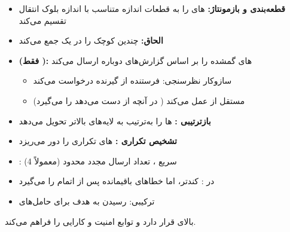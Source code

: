 
\begin{itemize}
\tightlist
\item
  \textbf{قطعه‌بندی و بازمونتاژ:} های  را به قطعات اندازه  متناسب با اندازه بلوک انتقال تقسیم می‌کند
\item
  \textbf{الحاق:} چندین  کوچک را در یک  جمع می‌کند
\item
  \textbf{ (فقط ):} های  گمشده را بر اساس گزارش‌های  دوباره ارسال می‌کند

  \begin{itemize}
  \tightlist
  \item
    سازوکار نظرسنجی: فرستنده  از گیرنده  درخواست می‌کند
  \item
    مستقل از  عمل می‌کند ( در  آنچه  از دست می‌دهد را می‌گیرد)
  \end{itemize}
\item
  \textbf{بازترتیبی :} ها را به‌ترتیب به لایه‌های بالاتر تحویل می‌دهد
\item
  \textbf{تشخیص تکراری :} های تکراری را دور می‌ریزد
\end{itemize}


\begin{itemize}
\tightlist
\item
  : سریع ، تعداد ارسال مجدد محدود (معمولاً 4)
\item
   در : کندتر، اما خطاهای باقیمانده پس از اتمام  را می‌گیرد
\item
  ترکیبی: رسیدن به  هدف  برای حامل‌های 
\end{itemize}


 بالای  قرار دارد و توابع امنیت و کارایی را فراهم می‌کند.



